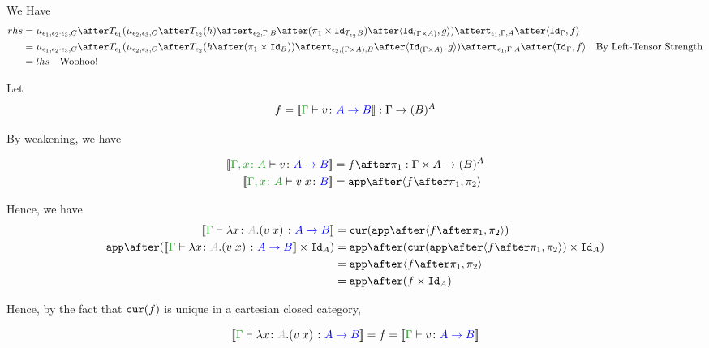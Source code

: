 \documentclass{report}
\begin{document}
We Have
\begin{equation}
\begin{split}
    rhs ={} & \bind{\e_1}{\e_2\dot\e_3}{C}\after\T{\e_1}{(\bind{\e_2}{\e_3}{C}\after \T{\e_2}{(h)} \after \tstrength{\e_2}{\G}{B}\after(\p\times\Id{\T{\e_2}{B}})\after\pr{\Id{(\G\times A)}}{g})}\after\tstrength{\e_1}{\G}{A}\after\pr{\idg}{f}\\
    ={} & \bind{\e_1}{\e_2\dot\e_3}{C}\after\T{\e_1}{(\bind{\e_2}{\e_3}{C}\after \T{\e_2}{(h \after (\p\times\Id{B}))}\after\tstrength{\e_2}{(\G\times A)}{B}\after\pr{\Id{(\G\times A)}}{g})}\after\tstrength{\e_1}{\G}{A}\after\pr{\idg}{f}\qt{By Left-Tensor Strength}\\
    ={} & lhs \qt{Woohoo!}
\end{split}
\end{equation}


Let 
\begin{equation}
    f = \deno{\gtyperelation{v}{\ab}} : \G \rightarrow (B)^{A}
\end{equation}

By weakening, we have

\begin{align}
    \deno{\typerelation{\gax}{v}{\ab}} & = f \after \p : \G \times A \rightarrow (B)^A \\
    \deno{\typerelation{\gax}{\apply{v}{x}}{B}} & = \app\after\pr{f \after \p}{\pp} \\
\end{align}

Hence, we have 
\begin{equation}
    \begin{split}
        \deno{\gtyperelation{\lam{x}{A}{(\apply{v}{x})}}{\ab}} & = \cur{\app\after\pr{f \after \p}{\pp}}\\
        \app\after(\deno{\gtyperelation{\lam{x}{A}{(\apply{v}{x})}}{\ab}} \times \Id{A}) & = \app \after(\cur{\app\after\pr{f \after \p}{\pp}}\times \Id{A})\\
        & = \app \after\pr{f\after\p}{\pp}\\
        & = \app\after(f\times\Id{A})
    \end{split}
\end{equation}

Hence, by the fact that $\texttt{cur}(f)$ is unique in a cartesian closed category, 

\begin{equation}
    \deno{\gtyperelation{\lam{x}{A}{(\apply{v}{x})}}{\ab}} = f =\deno{\gtyperelation{v}{\ab}}
\end{equation}
\end{document}
